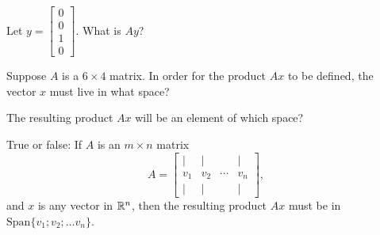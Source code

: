 


Let $y = \left[\begin{array}{c} 0 \\ 0 \\ 1 \\0
\end{array} \right].$   What is $Ay$?  


\edXsolution{ 
}


\endedxproblem




Suppose $A$ is a $6\times 4$ matrix.  In order for the product $Ax$ to be defined, the vector $x$ must live
in what space?  



The resulting product $Ax$ will be an element of which space?  


\edXsolution{  }

\endedxproblem






True or false: If $A$ is an $m\times n$ matrix
\[ A = \left[ \begin{array}{cccc} | & | & & | \\ 
v_1 & v_2 & \cdots & v_n \\
 | & | & & | \end{array} \right], \]
 and $x$ is any vector in $\mathbb R^n$, then the resulting product $Ax$ must be in $\mathrm{Span}\{v_1; v_2; \ldots v_n\}$.  



\edXsolution{  }

\endedxproblem





\endedxvertical




